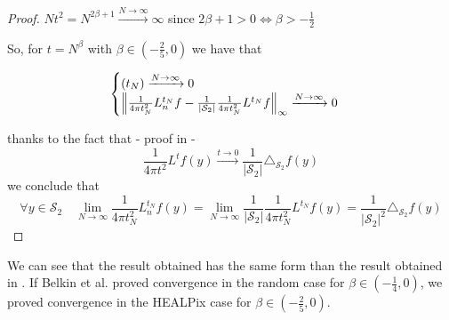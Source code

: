 \begin{proof}
	$Nt^2=N^{2\beta+1}\xrightarrow {N \to \infty} \infty$ since $2\beta+1>0 \iff \beta>-\frac{1}{2}$
	
	So, for $t=N^\beta$ with $\beta\in(-\frac{2}{5}, 0)$ we have that 
	
	$$\begin{cases}
	(t_N)\xrightarrow{N\to\infty}0\\
	\left\lVert\frac{1}{4\pi t_N^2}L_n^{t_N}f-\frac{1}{|\mathcal S_2|}\frac{1}{4\pi t_N^2}L^{t_N}f\right\rVert_\infty  \xrightarrow{N\to\infty}0
	\end{cases}$$

	
thanks to the fact that - proof in \cite{Belkin:2005:TTF:2138147.2138189} - 
	$$\frac{1}{4\pi t^2} L^tf(y) \xrightarrow{t\to 0 } \frac{1}{|\mathcal S_2|}\triangle_{\mathcal S_2}f(y)$$
	we conclude that
	$$\forall y\in\mathcal S_2 \quad \lim_{N\to\infty}\frac{1}{4\pi t_N^2} L_n^{t_N}f(y) =  \lim_{N\to\infty}\frac{1}{|\mathcal S_2|}\frac{1}{4\pi t_N^2} L^{t_N}f(y) = \frac{1}{|\mathcal S_2|^2}\triangle_{\mathcal S_2}f(y) $$
\end{proof}
We can see that the result obtained has the same form than the result obtained in \cite{Belkin:2005:TTF:2138147.2138189}. If Belkin et al. proved convergence in the random case for $\beta \in (-\frac{1}{4}, 0)$, we proved convergence in the HEALPix case for $\beta \in (-\frac{2}{5}, 0)$.